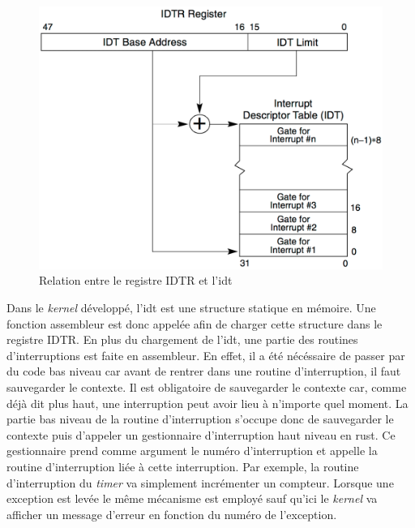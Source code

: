 \begin{figure}[!h]
  \centering
  \includegraphics[scale=0.6]{images/idtr.png}
  \caption{Relation entre le registre IDTR et l'\acrshort{idt}}
  \label{idtr}
\end{figure}

Dans le \textit{kernel} développé, l'\acrshort{idt} est une structure statique
en mémoire. Une fonction assembleur est donc appelée afin de charger cette
structure dans le registre IDTR. En plus du chargement de l'\acrshort{idt}, une
partie des routines d'interruptions est faite en assembleur. En effet, il a été
nécéssaire de passer par du code bas niveau car avant de rentrer dans une
routine d'interruption, il faut sauvegarder le contexte. Il est obligatoire
de sauvegarder le contexte car, comme déjà dit plus haut, une interruption
peut avoir lieu à n'importe quel moment. La partie bas niveau de la routine
d'interruption s'occupe donc de sauvegarder le contexte puis d'appeler un
gestionnaire d'interruption haut niveau en rust. Ce gestionnaire prend comme argument
le numéro d'interruption et appelle la routine d'interruption liée à cette interruption.
Par exemple, la routine d'interruption du \textit{timer} va simplement incrémenter
un compteur. Lorsque une exception est levée le même mécanisme est employé sauf
qu'ici le \textit{kernel} va afficher un message d'erreur en fonction du numéro
de l'exception.


